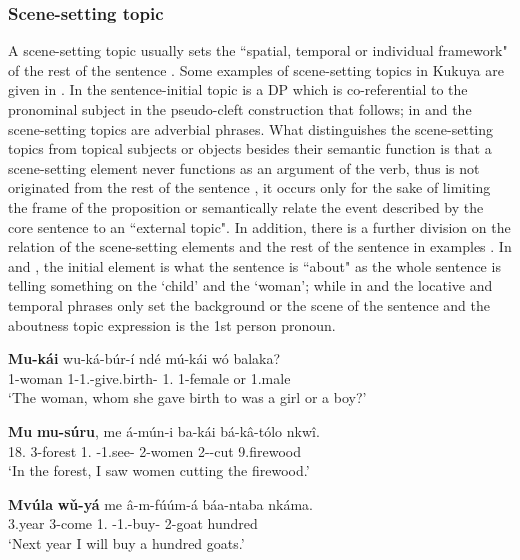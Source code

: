 \documentclass[output=paper,colorlinks,citecolor=brown,
]{langscibook}
\begin{document}
\subsubsection{Scene-setting topic}\label{teke:sec:4.1.2}
A scene-setting topic usually sets the ``spatial, temporal or individual framework" of the rest of the sentence \citep{Chafe1976, LiThompson1976}. Some examples of scene-setting topics in Kukuya are given in . In  the sentence-initial topic is a DP which is co-referential to the pronominal subject in the pseudo-cleft construction that follows; in  and  the scene-setting topics are adverbial phrases. What distinguishes the scene-setting topics from topical subjects or objects besides their semantic function is that a scene-setting element never functions as an argument of the verb, thus is not originated from the rest of the sentence \citep{Lambrecht1994}, it occurs only for the sake of limiting the frame of the proposition or semantically relate the event described by the core sentence to an ``external topic". In addition, there is a further division on the relation of the scene-setting elements and the rest of the sentence in examples . In  and , the initial element is what the sentence is ``about" as the whole sentence is telling something on the `child' and the `woman'; while in  and  the locative and temporal phrases only set the background or the scene of the sentence and the aboutness topic expression is the 1st person pronoun. 
\begin{exe}
\ex
\label{101}
\gll
\textbf{Mu-kái} wu-ká-búr-í ndé mú-kái wó balaka?\\
1-woman 1\Rel{}-1\Sm{}.\Pst{}-give.birth-\Pst{} 1.\Pro{} 1-female or 1.male\\
\trans ‘The woman, whom she gave birth to was a girl or a boy?’

\end{exe}
\begin{exe}
\ex
\label{102}
\gll
\textbf{Mu} \textbf{mu-súru}, me á-mún-i ba-kái bá-k\^{a}-tólo nkwî.\\
18.\Loc{} 3-forest 1\Sg{}.\Pro{} \Pst{}-1\Sg{}.see-\Pst{} 2-women 2\Sm{}-\Prog{}-cut 9.firewood\\
\trans ‘In the forest, I saw women cutting the firewood.’

\end{exe}
\begin{exe}
\ex
\label{103}
\gll
\textbf{Mvúla} \textbf{wǔ-yá} me â-m-fúúm-á báa-ntaba nkáma.\\
3.year 3\Rel{}-come 1\Sg{}.\Pro{} \Fut{}-1\Sg{}.\Sm{}-buy-\Fv{} 2-goat hundred\\
\trans ‘Next year I will buy a hundred goats.’

\end{exe}
\end{document}
